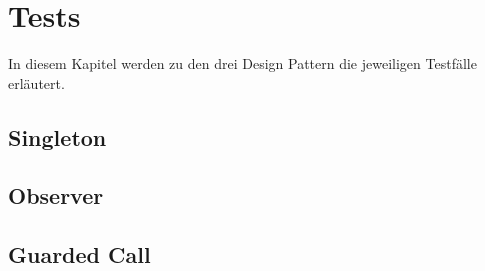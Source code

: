 \chapter{Tests}

In diesem Kapitel werden zu den drei Design Pattern die jeweiligen Testfälle erläutert.

\section{Singleton}

\section{Observer}

\section{Guarded Call}


